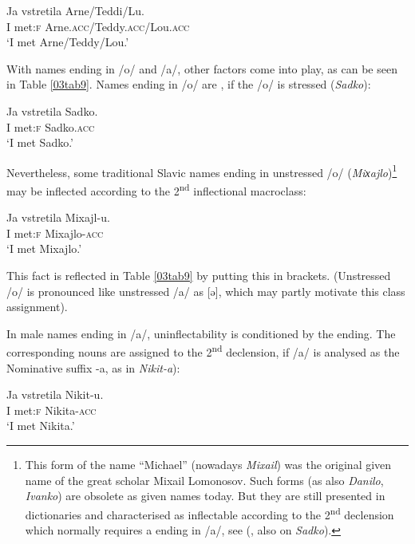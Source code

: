 \documentclass[output=paper,colorlinks,citecolor=brown]{langscibook}
\begin{document}
\begin{exe}
	\ex \gll Ja vstretila Arne/Teddi/Lu. \\
	I met:\textsc{f} Arne.\textsc{acc}/Teddy.\textsc{acc}/Lou.\textsc{acc} \\
	\trans `I met Arne/Teddy/Lou.'
\end{exe}

With names ending in /o/ and /a/, other factors come into play, as can be seen in Table \ref{03tab9}. Names ending in /o/ are , if the /o/ is stressed (\emph{Sadko}):

\begin{exe}
	\ex \gll Ja vstretila Sadko. \\
	I met:\textsc{f} Sadko.\textsc{acc} \\
	\trans `I met Sadko.'
\end{exe}

Nevertheless, some traditional Slavic names ending in unstressed /o/ (\emph{Miхajlo})\footnote{This form of the name ``Michael'' (nowadays \emph{Mixail}) was the original given name of the great  scholar Mixail Lomonosov. Such forms (as also \emph{Danilo}, \emph{Ivanko}) are obsolete as given names today. But they are still presented in dictionaries \citep{petrovskij-nodate} and characterised as inflectable according to the 2\textsuperscript{nd} declension which normally requires a  ending in /a/, see \citeauthor{zaliznjak2008} (\citeyear[739]{zaliznjak2008}, also on \emph{Sadko}).} may be inflected according to the 2\textsuperscript{nd} inflectional macroclass:

\begin{exe}
	\ex \gll Ja vstretila Mixajl-u. \\
	I met:\textsc{f} Mixajlo-\textsc{acc} \\
	\trans `I met Mixajlo.'
\end{exe}

This fact is reflected in Table \ref{03tab9} by putting this  in brackets. (Unstressed /o/ is pronounced like unstressed /a/ as [ə], which may partly motivate this class assignment).

In male names ending in /a/, uninflectability is conditioned by the  ending. The corresponding nouns are assigned to the 2\textsuperscript{nd} declension, if /a/ is analysed as the Nominative suffix -a, as in \emph{Nikit-a}):

\begin{exe}
	\ex \gll Ja vstretila Nikit-u. \\
	I met:\textsc{f} Nikita-\textsc{acc} \\
	\trans `I met Nikita.'
\end{exe}
\end{document}
